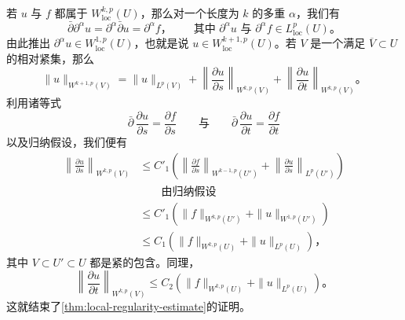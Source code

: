 若 $u$ 与 $f$ 都属于 $W^{k,p}_{\mathrm{loc}}(U)$，那么对一个长度为 $k$ 的多重\trIndex{} $\alpha$，我们有
\[
\bar{\partial}\partial^{\alpha}u=\partial^{\alpha}\bar{\partial}u=\partial^{\alpha}f\text{，}\qquad\text{其中 }\partial^{\alpha}u\text{ 与 }\partial^{\alpha}f\in L^{p}_{\mathrm{loc}}(U)\text{。}
\]
由此推出 $\partial^{\alpha}u\in W^{1,p}_{\mathrm{loc}}(U)$，也就是说 $u\in W^{k+1,p}_{\mathrm{loc}}(U)$。若 $V$ 是一个满足 $\overline{V}\subset U$ 的相对紧\trOpen{}集，那么
\[
\|u\|_{W^{k+1,p}(V)}=\|u\|_{L^{p}(V)}+\left\|\frac{\partial u}{\partial s}\right\|_{W^{k,p}(V)}+\left\|\frac{\partial u}{\partial t}\right\|_{W^{k,p}(V)}\text{。}
\]
利用诸等式
\[
\bar{\partial}\,\frac{\partial u}{\partial s}=\frac{\partial f}{\partial s}\qquad\text{与}\qquad\bar{\partial}\,\frac{\partial u}{\partial t}=\frac{\partial f}{\partial t}
\]
以及归纳假设，我们便有
\[
\begin{aligned}
\left\|\frac{\partial u}{\partial s}\right\|_{W^{k,p}(V)}&\le C'_{1}\left(\left\|\frac{\partial f}{\partial s}\right\|_{W^{k-1,p}(U')}+\left\|\frac{\partial u}{\partial s}\right\|_{L^{p}(U')}\right)\\
&\qquad\text{由归纳假设}\\
&\le C'_{1}\left(\|f\|_{W^{k,p}(U')}+\|u\|_{W^{1,p}(U')}\right)\\
&\le C_{1}\left(\|f\|_{W^{k,p}(U)}+\|u\|_{L^{p}(U)}\right)\text{，}
\end{aligned}
\]
其中 $V\subset U'\subset U$ 都是紧的包含。同理，
\[
\left\|\frac{\partial u}{\partial t}\right\|_{W^{k,p}(V)}\le C_{2}\left(\|f\|_{W^{k,p}(U)}+\|u\|_{L^{p}(U)}\right)\text{。}
\]
这就结束了\cref{thm:local-regularity-estimate}的证明。\noqed
